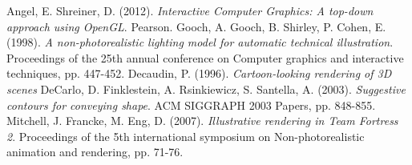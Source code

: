 \begin{thebibliography}{9}
Angel, E. Shreiner, D. (2012). \emph{Interactive Computer Graphics: A top-down approach using OpenGL}. Pearson. 
Gooch, A. Gooch, B. Shirley, P. Cohen, E. (1998). \emph{A non-photorealistic lighting model for automatic technical illustration}. Proceedings of the 25th annual conference on Computer graphics and interactive techniques, pp. 447-452.
Decaudin, P. (1996). \emph{Cartoon-looking rendering of 3D scenes} 
DeCarlo, D. Finklestein, A. Rsinkiewicz, S. Santella, A. (2003). \emph{Suggestive contours for conveying shape}. ACM SIGGRAPH 2003 Papers, pp. 848-855.
Mitchell, J. Francke, M. Eng, D. (2007). \emph{Illustrative rendering in Team Fortress 2}. Proceedings of the 5th international symposium on Non-photorealistic animation and rendering, pp. 71-76.
\end{thebibliography}
